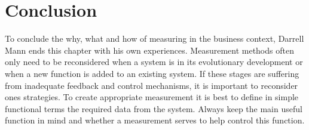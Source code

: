 \chapter{Conclusion}

To conclude the why, what and how of measuring in the business context, Darrell Mann ends this chapter with his own experiences.
Measurement methods often only need to be reconsidered when a system is in its evolutionary development or when a new function is added to an existing system.
If these stages are suffering from inadequate feedback and control mechanisms, it is important to reconsider ones strategies.
To create appropriate measurement it is best to define in simple functional terms the required data from the system.
Always keep the main useful function in mind and whether a measurement serves to help control this function. 